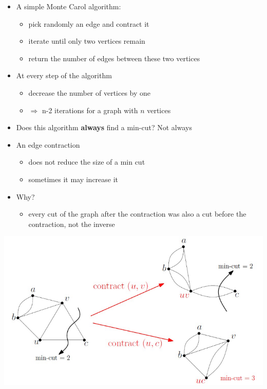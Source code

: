 \documentclass{article}[18pt]
\begin{document}
\begin{itemize}
	\item A simple Monte Carol algorithm:
	\begin{itemize}
		\item pick randomly an edge and contract it
		\item iterate until only two vertices remain
		\item return the number of edges between these two vertices
	\end{itemize}
	\item At every step of the algorithm
	\begin{itemize}
		\item decrease the number of vertices by one
		\item $\Rightarrow$ n-2 iterations for a graph with $n$ vertices
	\end{itemize}
	\item Does this algorithm \textbf{always} find a min-cut? Not always
	\item An edge contraction
	\begin{itemize}
		\item does not reduce the size of a min cut
		\item sometimes it may increase it
	\end{itemize}
	\item Why?
	\begin{itemize}
		\item every cut of the graph after the contraction was also a cut before the contraction, not the inverse
	\end{itemize}
\end{itemize}
\begin{center}
	\includegraphics[scale=0.7]{min-cut}
\end{center}
\end{document}
